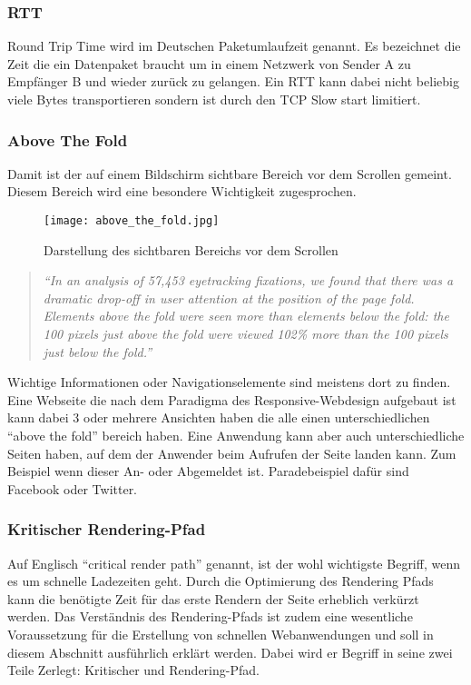		\subsubsection{RTT} %
		\label{ssub:rtt}
			Round Trip Time wird im Deutschen Paketumlaufzeit genannt. Es bezeichnet die Zeit die ein Datenpaket braucht um in einem Netzwerk von Sender A zu Empfänger B und wieder zurück zu gelangen. Ein RTT kann dabei nicht beliebig viele Bytes transportieren sondern ist durch den TCP Slow start limitiert. 
		
		\subsubsection{Above The Fold} %
		\label{ssub:above_the_fold}
			Damit ist der auf einem Bildschirm sichtbare Bereich vor dem Scrollen gemeint. Diesem Bereich wird eine besondere Wichtigkeit zugesprochen.
			\begin{figure}[htbp]
				\begin{center}
					\texttt{[image: above\_the\_fold.jpg]}
					\caption{Darstellung des sichtbaren Bereichs vor dem Scrollen}
					\label{fig:above_the_fold}
				\end{center}
			\end{figure}

			\begin{quote}
				 \textit{"`In an analysis of 57,453 eyetracking fixations, we found that there was a dramatic drop-off in user attention at the position of the page fold. Elements above the fold were seen more than elements below the fold: the 100 pixels just above the fold were viewed 102\% more than the 100 pixels just below the fold."'} \autocite{nng15}
			\end{quote}

			Wichtige Informationen oder Navigationselemente sind meistens dort zu finden. Eine Webseite die nach dem Paradigma des Responsive-Webdesign aufgebaut ist kann dabei 3 oder mehrere Ansichten haben die alle einen unterschiedlichen "`above the fold"' bereich haben. Eine Anwendung kann aber auch unterschiedliche Seiten haben, auf dem der Anwender beim Aufrufen der Seite landen kann. Zum Beispiel wenn dieser An- oder Abgemeldet ist. Paradebeispiel dafür sind Facebook oder Twitter.

		\subsubsection{Kritischer Rendering-Pfad} %
		\label{ssub:critical_render_path}
			Auf Englisch "`critical render path"' genannt, ist der wohl wichtigste Begriff, wenn es um schnelle Ladezeiten geht. Durch die Optimierung des Rendering Pfads kann die benötigte Zeit für das erste Rendern der Seite erheblich verkürzt werden. Das Verständnis des Rendering-Pfads ist zudem eine wesentliche Voraussetzung für die Erstellung von schnellen Webanwendungen und soll in diesem Abschnitt ausführlich erklärt werden. Dabei wird er Begriff in seine zwei Teile Zerlegt: Kritischer und Rendering-Pfad.\\

